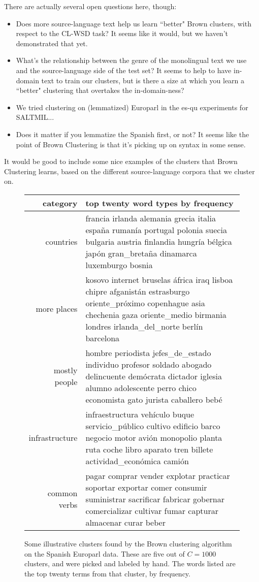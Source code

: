 There are actually several open questions here, though:

\begin{itemize}
  \item Does more source-language text help us learn ``better" Brown clusters,
    with respect to the CL-WSD task? It seems like it would, but we haven't
    demonstrated that yet.
  \item What's the relationship between the genre of the monolingual text we
    use and the source-language side of the test set? It seems to help to have
    in-domain text to train our clusters, but is there a size at which you
    learn a ``better" clustering that overtakes the in-domain-ness?
  \item We tried clustering on (lemmatized) Europarl in the es-qu experiments for SALTMIL...
  \item Does it matter if you lemmatize the Spanish first, or not? It seems
    like the point of Brown Clustering is that it's picking up on syntax in
    some sense.
\end{itemize}

It would be good to include some nice examples of the clusters that Brown
Clustering learns, based on the different source-language corpora that we
cluster on.


\begin{figure*}[t!]
  \begin{tabular}{|r|p{10cm}|}
    \hline
    category  & top twenty word types by frequency \\
    \hline
    countries & francia irlanda alemania grecia italia españa rumanía portugal polonia suecia bulgaria austria finlandia hungría bélgica japón gran\_bretaña dinamarca luxemburgo bosnia \\
    \hline
    more places & kosovo internet bruselas áfrica iraq lisboa chipre afganistán estrasburgo oriente\_próximo copenhague asia chechenia gaza oriente\_medio birmania londres irlanda\_del\_norte berlín barcelona \\
    \hline
    mostly people & hombre periodista jefes\_de\_estado individuo profesor soldado abogado delincuente demócrata dictador iglesia alumno adolescente perro chico economista gato jurista caballero bebé \\
    \hline
    infrastructure & infraestructura vehículo buque servicio\_público cultivo edificio barco negocio motor avión monopolio planta ruta coche libro aparato tren billete actividad\_económica camión \\
    \hline
    common verbs & pagar comprar vender explotar practicar soportar exportar comer consumir suministrar sacrificar fabricar gobernar comercializar cultivar fumar capturar almacenar curar beber \\
    \hline
  \end{tabular}
\caption{Some illustrative clusters found by the Brown clustering algorithm on
the Spanish Europarl data. These are five out of $C=1000$ clusters, and
were picked and labeled by hand. The words listed are the
top twenty terms from that cluster, by frequency.}
\label{fig:clusters}
\end{figure*}

